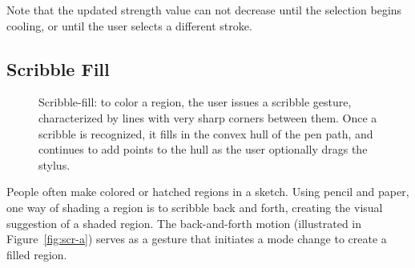 \documentclass{egpubl}
\begin{document}
Note that the updated strength value can not decrease until the
selection begins cooling, or until the user selects a different
stroke.

\subsection{Scribble Fill}

\begin{figure}
  \centering {}
\hspace{0.4cm} 
  \caption{Scribble-fill: to color a region, the user issues a
    scribble gesture, characterized by lines with very sharp corners
    between them. Once a scribble is recognized, it fills in the
    convex hull of the pen path, and continues to add points to the
    hull as the user optionally drags the stylus.}
  \label{fig:scr}
\end{figure}

People often make colored or hatched regions in a sketch. Using pencil
and paper, one way of shading a region is to scribble back and forth,
creating the visual suggestion of a shaded region. The back-and-forth
motion (illustrated in Figure~\ref{fig:scr-a}) serves as a gesture
that initiates a mode change to create a filled region.
\end{document}
